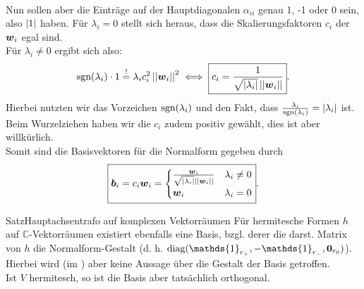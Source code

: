 \begin{Satz}
{\begin{eqnarray*}
\end{eqnarray*}
Nun sollen aber die Einträge auf der Hauptdiagonalen $\alpha_{ii}$ genau 1, -1 oder 0 sein, also $\left|{1}\right|$ haben. Für $\lambda_i=0$ stellt sich heraus, dass die Skalierungsfaktoren $c_i$ der ${{\text{\boldmath${w}$}}}_i$ egal sind.\\
Für $\lambda_i\neq0$ ergibt sich also:
\begin{equation}
    \text{sgn}(\lambda_i)\cdot 1\overset{!}{=}\lambda_ic_i^2\left|\left|{{\text{\boldmath${w}$}}}_i\right|\right|^2\iff \boxed{c_i=\frac{1}{\sqrt{\left|{\lambda_i}\right|}\left|\left|{{\text{\boldmath${w}$}}}_i\right|\right|}}.
\end{equation}
Hierbei nutzten wir das Vorzeichen $\text{sgn}(\lambda_i)$ und den Fakt, dass $\frac{\lambda_i}{\text{sgn}(\lambda_i)}=\left|{\lambda_i}\right|$ ist. Beim Wurzelziehen haben wir die $c_i$ zudem positiv gewählt, dies ist aber willkürlich.\\
Somit sind die Basisvektoren für die Normalform gegeben durch
\begin{equation*}
    \boxed{{{\text{\boldmath${b}$}}}_i=c_i{{\text{\boldmath${w}$}}}_i=\begin{cases}\frac{{{\text{\boldmath${w}$}}}_i}{\sqrt{\left|{\lambda_i}\right|}\left|\left|{{\text{\boldmath${w}$}}}_i\right|\right|}&\lambda_i\neq0\\{{\text{\boldmath${w}$}}}_i&\lambda_i=0\end{cases}}.
\end{equation*}}
\end{Satz}

\begin{Satz}
{Satz}{Hauptachsentrafo auf komplexen Vektorräumen}
Für hermitesche Formen $h$ auf $\mathbb{C}$-Vektorräumen existiert ebenfalls eine Basis, bzgl. derer die darst. Matrix von $h$ die Normalform-Gestalt (d. h. $\diag(\mathds{1}_{r_+},-\mathds{1}_{r_-},\Vec{0}_{r_0})$).\\
Hierbei wird (im \Skript{}) aber keine Aussage über die Gestalt der Basis getroffen.\\
Ist $V$ hermitesch, so ist die Basis aber tatsächlich orthogonal.
\end{Satz}

